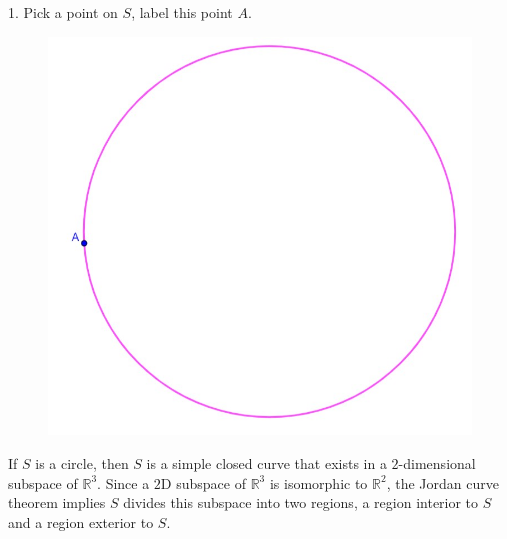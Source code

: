 \documentclass[11pt]{amsart}
\newcommand{\R}{\mathbb{R}}
\theoremstyle{plain}
\theoremstyle{definition}
\theoremstyle{remark}
\begin{document}
1. Pick a point on
\(S\), label this point \(A\).
\begin{center}
	\begin{figure}[h]
		\includegraphics[scale=0.6]{circle_1.jpg}
	\end{figure}
\end{center}
If \(S\) is a circle, then \(S\) is a simple closed curve that exists
in a $2$-dimensional subspace of \(\R^3\).  Since a $2$D subspace of
\(\R^3\) is isomorphic to \(\R^2\), the Jordan curve theorem implies
\(S\) divides this subspace into two regions, a region interior to
\(S\) and a region exterior to \(S\).
\end{document}
